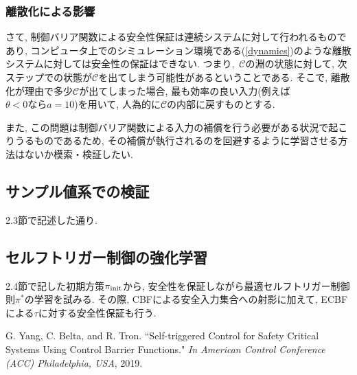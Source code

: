 \documentclass{jsarticle}
\begin{document}
\subsubsection{離散化による影響}
さて, 制御バリア関数による安全性保証は連続システムに対して行われるものであり, コンピュータ上でのシミュレーション環境である(\ref{dynamics})のような離散システムに対しては安全性の保証はできない. つまり,~$\mathcal{C}$の淵の状態に対して, 次ステップでの状態が$\mathcal{C}$を出てしまう可能性があるということである. そこで, 離散化が理由で多少$\mathcal{C}$が出てしまった場合, 最も効率の良い入力(例えば$\theta<0ならa=10$)を用いて, 人為的に$\mathcal{C}$の内部に戻すものとする.\par
また, この問題は制御バリア関数による入力の補償を行う必要がある状況で起こりうるものであるため, その補償が執行されるのを回避するように学習させる方法はないか模索・検証したい. 

\subsection{サンプル値系での検証}
2.3節で記述した通り.

\subsection{セルフトリガー制御の強化学習}
2.4節で記した初期方策$\pi_{\rm{init}}$から, 安全性を保証しながら最適セルフトリガー制御則$\pi^{*}$の学習を試みる. その際, CBFによる安全入力集合への射影に加えて, ECBFによる$\tau$に対する安全性保証も行う. 


\begin{thebibliography}{10}
G. Yang, C. Belta, and R. Tron. “Self-triggered Control for Safety Critical Systems Using Control Barrier Functions."  \textit{In American Control Conference (ACC) Philadelphia, USA}, 2019.
 
 \end{thebibliography}
\end{document}
